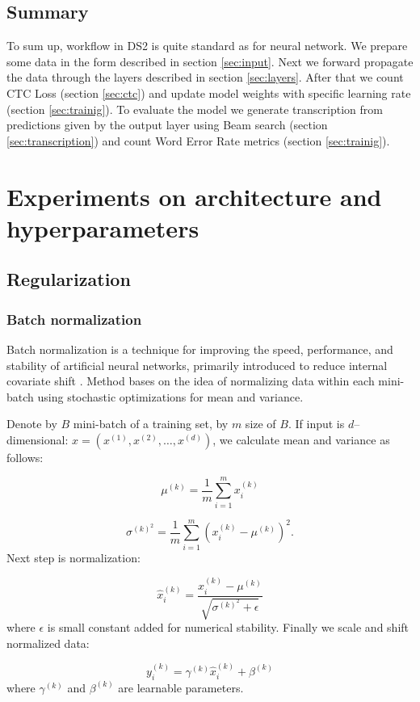 \documentclass[licencjacka,en]{pracamgr}
\begin{document}
\section{Summary}
To sum up, workflow in DS2 is quite standard as for neural network. We prepare some data in the form described in section \ref{sec:input}. Next we forward propagate the data through the layers described in section \ref{sec:layers}. After that we count CTC Loss (section \ref{sec:ctc}) and update model weights with specific learning rate (section \ref{sec:trainig}). To evaluate the model we generate transcription from predictions given by the output layer using Beam search (section \ref{sec:transcription}) and count Word Error Rate metrics (section \ref{sec:trainig}).


\chapter{Experiments on architecture and hyperparameters}\label{r:experiments}

\section{Regularization}
\subsection{Batch normalization}
Batch normalization is a technique for improving the speed, performance, and stability of artificial neural networks, primarily introduced to reduce internal covariate shift \cite{BN}. Method bases on the idea of normalizing data within each mini-batch using stochastic optimizations for mean and variance.

Denote by $B$ mini-batch of a training set, by $m$ size of $B$. If input is $d$--dimensional: $x = (x^{(1)}, x^{(2)}, \ldots, x^{(d)})$, we calculate mean and variance as follows:

$$\mu^{(k)} = \frac{1}{m}\sum_{i=1}^m x^{(k)}_i$$

$$ \sigma^{{(k)}^2} = \frac{1}{m} \sum_{i = 1}^{m} \left(x^{(k)}_i - \mu^{(k)}\right) ^ 2.$$
Next step is normalization:

$$
\hat{x} ^ {(k)} _ i = \frac{x^{(k)}_i - \mu^{(k)}} {\sqrt{ \sigma^{{(k)}^2} + \epsilon}}
$$
where $\epsilon$ is small constant added for numerical stability. Finally we scale and shift normalized data:

$$ y^{(k)}_i = \gamma^{(k)} \hat{x}^{(k)}_i + \beta^{(k)}$$
where $\gamma^{(k)}$ and $\beta^{(k)}$ are learnable parameters.
\end{document}
